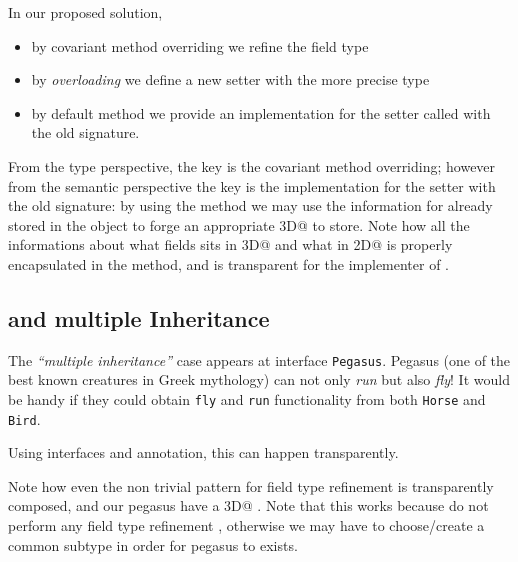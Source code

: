 In our proposed solution,
\begin{itemize}
\item by covariant method overriding we refine the field type
\item by \emph{overloading} we define a new setter with the more precise type
\item by default method we provide an implementation for the setter called with the old signature.
\end{itemize}

From the type perspective, the key is the covariant method overriding; however from the semantic perspective the key is the implementation for the setter with the old signature:
by using the \Q@with@ method we may use the information for \Q@z@ already stored in the object to forge an appropriate \Q@Point3D@ to store.
Note how all the informations about what fields sits in \Q@Point3D@ and what in \Q@Point2D@ is properly encapsulated in the \Q@with@ method, and is transparent for the implementer of \Q@Bird@.


\subsection{\Q@Pegasus@ and multiple Inheritance}
The \emph{``multiple inheritance''} case appears at interface
\texttt{Pegasus}.
Pegasus (one of the best known creatures
in Greek mythology) can not only \emph{run} but also \emph{fly}! 
It would be handy if they could obtain \texttt{fly} and \texttt{run} functionality from both \texttt{Horse} and \texttt{Bird}.

 Using interfaces and \mixin annotation,
this can happen transparently.


Note how  even the non trivial pattern for field type refinement is transparently composed, and our pegasus have a \Q@Point3D@ \Q@location@.
Note that this works because \Q@Horse@ do not perform any field type refinement , otherwise we may have to choose/create a common subtype in order for pegasus to exists.

